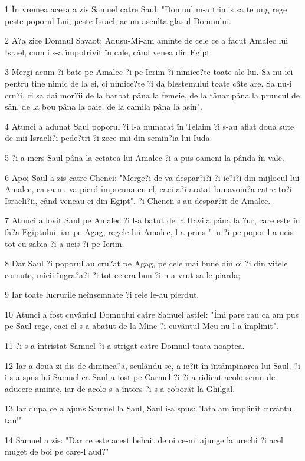 \par 1 În vremea aceea a zis Samuel catre Saul: "Domnul m-a trimis sa te ung rege peste poporul Lui, peste Israel; acum asculta glasul Domnului.
\par 2 A?a zice Domnul Savaot: Adusu-Mi-am aminte de cele ce a facut Amalec lui Israel, cum i s-a împotrivit în cale, când venea din Egipt.
\par 3 Mergi acum ?i bate pe Amalec ?i pe Ierim ?i nimice?te toate ale lui. Sa nu iei pentru tine nimic de la ei, ci nimice?te ?i da blestemului toate câte are. Sa nu-i cru?i, ci sa dai mor?ii de la barbat pâna la femeie, de la tânar pâna la pruncul de sân, de la bou pâna la oaie, de la camila pâna la asin".
\par 4 Atunci a adunat Saul poporul ?i l-a numarat în Telaim ?i s-au aflat doua sute de mii Israeli?i pede?tri ?i zece mii din semin?ia lui Iuda.
\par 5 ?i a mers Saul pâna la cetatea lui Amalec ?i a pus oameni la pânda în vale.
\par 6 Apoi Saul a zis catre Chenei: "Merge?i de va despar?i?i ?i ie?i?i din mijlocul lui Amalec, ca sa nu va pierd împreuna cu el, caci a?i aratat bunavoin?a catre to?i Israeli?ii, când veneau ei din Egipt". ?i Cheneii s-au despar?it de Amalec.
\par 7 Atunci a lovit Saul pe Amalec ?i l-a batut de la Havila pâna la ?ur, care este în fa?a Egiptului; iar pe Agag, regele lui Amalec, l-a prins " iu ?i pe popor l-a ucis tot cu sabia ?i a ucis ?i pe Ierim.
\par 8 Dar Saul ?i poporul au cru?at pe Agag, pe cele mai bune din oi ?i din vitele cornute, mieii îngra?a?i ?i tot ce era bun ?i n-a vrut sa le piarda;
\par 9 Iar toate lucrurile neînsemnate ?i rele le-au pierdut.
\par 10 Atunci a fost cuvântul Domnului catre Samuel astfel: "Îmi pare rau ca am pus pe Saul rege, caci el s-a abatut de la Mine ?i cuvântul Meu nu l-a împlinit".
\par 11 ?i s-a întristat Samuel ?i a strigat catre Domnul toata noaptea.
\par 12 Iar a doua zi dis-de-diminea?a, sculându-se, a ie?it în întâmpinarea lui Saul. ?i i s-a spus lui Samuel ca Saul a fost pe Carmel ?i ?i-a ridicat acolo semn de aducere aminte, iar de acolo s-a întors ?i s-a coborât la Ghilgal.
\par 13 Iar dupa ce a ajuns Samuel la Saul, Saul i-a spus: "Iata am împlinit cuvântul tau!"
\par 14 Samuel a zis: "Dar ce este acest behait de oi ce-mi ajunge la urechi ?i acel muget de boi pe care-l aud?"
